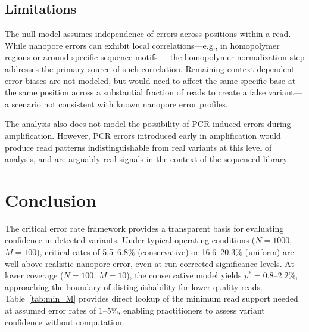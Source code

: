 \documentclass[11pt]{article}
\begin{document}
\subsection{Limitations}

The null model assumes independence of errors across positions within a read.
While nanopore errors can exhibit local correlations---e.g., in homopolymer
regions or around specific sequence motifs~\cite{delahaye2021}---the homopolymer normalization step
addresses the primary source of such correlation. Remaining context-dependent
error biases are not modeled, but would need to affect the same specific base at
the same position across a substantial fraction of reads to create a false
variant---a scenario not consistent with known nanopore error profiles.

The analysis also does not model the possibility of PCR-induced errors during
amplification. However, PCR errors introduced early in amplification would
produce read patterns indistinguishable from real variants at this level of
analysis, and are arguably real signals in the context of the sequenced library.

\section{Conclusion}

The critical error rate framework provides a transparent basis for evaluating
confidence in detected variants. Under typical operating conditions ($N = 1000$,
$M = 100$), critical rates of 5.5--6.8\% (conservative) or 16.6--20.3\%
(uniform) are well above realistic nanopore error, even at run-corrected
significance levels. At lower coverage ($N = 100$, $M = 10$), the conservative
model yields $p^* = 0.8$--$2.2\%$, approaching the boundary of
distinguishability for lower-quality reads. Table~\ref{tab:min_M} provides direct lookup of the minimum read support needed
at assumed error rates of 1--5\%, enabling practitioners to assess variant
confidence without computation.
\end{document}
